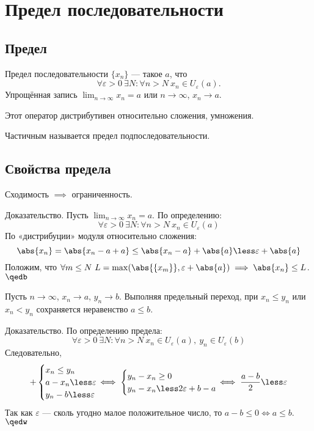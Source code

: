 \section{Предел последовательности}


\subsection{Предел}

{\bold Предел} последовательности $\{x_n\}$ --- такое $a$, что
$$\forall\varepsilon\greater 0\ \exists N\colon\forall n\greater N\ x_n\in U_
\varepsilon(a).$$
Упрощённая запись $\lim_{n\to\infty}x_n=a$ или $n\to\infty$, $x_n\to a$.

Этот оператор {\ital дистрибутивен} относительно {\ital сложения}, {\ital умножения}.

{\ital Частичным} называется предел подпоследовательности.

\subsection{Свойства предела}

Сходимость $\implies$ ограниченность.

{\bold Доказательство.} Пусть $\lim_{n\to\infty}x_n=a$. По определению:
$$\forall\varepsilon\greater 0\ \exists N\colon\forall n\greater N\ x_n\in U_
\varepsilon(a)$$
По «дистрибуции» модуля относительно сложения:
$$\abs{x_n}=\abs{x_n-a+a}\leq\abs{x_n-a}+\abs{a}\less\varepsilon+\abs{a}$$
Положим, что $\forall m\leq N\ L=\max(\abs{\{x_m\}},\varepsilon+\abs{a})\implies\abs{x_n}
\leq L$.$\qedb$

Пусть $n\to\infty$, $x_n\to a$, $y_n\to b$. Выполняя {\ital предельный переход}, 
при $x_n\leq y_n$ или $x_n\less y_n$ сохраняется неравенство $a\leq b$.

{\bold Доказательство.} По определению предела:
$$\forall\varepsilon\greater 0\ \exists N\colon\forall n\greater N\ x_n\in U_
\varepsilon(a),\ y_n\in U_\varepsilon(b)$$
Следовательно,
$$+\begin{cases}
x_n\leq y_n\\
a-x_n\less\varepsilon\\
y_n-b\less\varepsilon
\end{cases}\hspace*{-12pt}\iff
\begin{cases}
y_n-x_n\geq 0\\
y_n-x_n\less 2\varepsilon+b-a
\end{cases}\hspace*{-12pt}\iff
\frac{a-b}{2}\less\varepsilon$$
Так как $\varepsilon$ --- сколь угодно малое положительное число, то $a-b\leq 0\iff a\leq 
b$.$\qedw$

